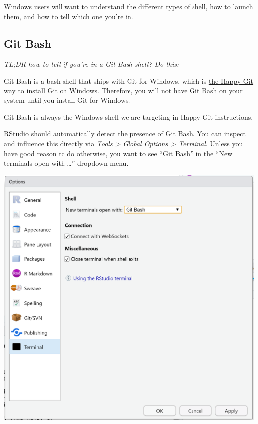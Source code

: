\documentclass[
]{book}
\newenvironment{Shaded}{\begin{snugshade}}{\end{snugshade}}
\newcommand{\ExtensionTok}[1]{#1}
\newcommand{\NormalTok}[1]{#1}
\newcommand{\VariableTok}[1]{\textcolor[rgb]{0.00,0.00,0.00}{#1}}
\begin{document}
Windows users will want to understand the different types of shell, how to launch them, and how to tell which one you're in.

\subsection{Git Bash}\label{git-bash}

\emph{TL;DR how to tell if you're in a Git Bash shell? Do this:}

\begin{Shaded}
\end{Shaded}

Git Bash is a bash shell that ships with Git for Windows, which is \hyperref[install-git-windows]{the Happy Git way to install Git on Windows}. Therefore, you will not have Git Bash on your system until you install Git for Windows.

Git Bash is always the Windows shell we are targeting in Happy Git instructions.

RStudio should automatically detect the presence of Git Bash. You can inspect and influence this directly via \emph{Tools \textgreater{} Global Options \textgreater{} Terminal}. Unless you have good reason to do otherwise, you want to see ``Git Bash'' in the ``New terminals open with \ldots{}'' dropdown menu.

\includegraphics{img/git-bash-as-rstudio-terminal.png}
\end{document}
